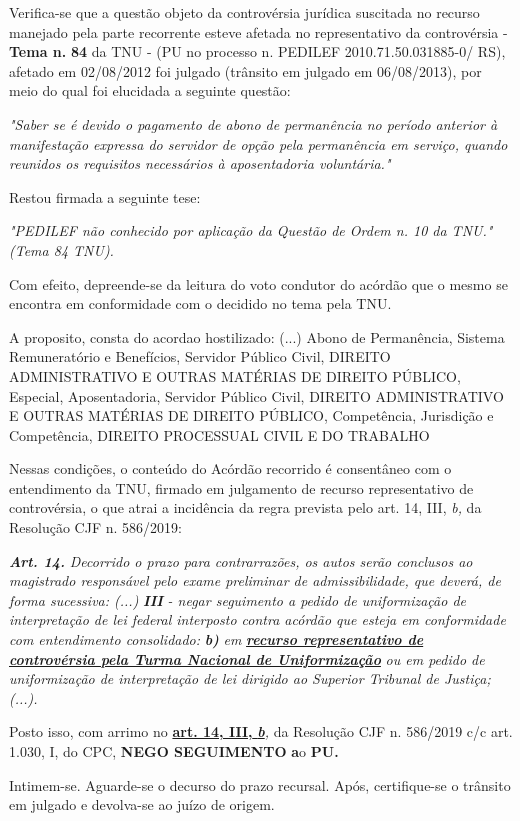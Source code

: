 \documentclass[12pt]{article}
\begin{document}
\justifying
\noindent Verifica-se que a questão objeto da controvérsia jurídica suscitada no recurso manejado pela parte recorrente esteve afetada no representativo da controvérsia - \textbf{Tema n. }\textbf{84} da TNU - (PU no processo n. PEDILEF 2010.71.50.031885-0/ RS),  afetado em 02/08/2012 foi julgado (trânsito em julgado em 06/08/2013), por meio do qual foi elucidada a seguinte questão:

\noindent \textit{"Saber se é devido o pagamento de abono de permanência no período anterior à manifestação expressa do servidor de opção pela permanência em serviço, quando reunidos os requisitos necessários à aposentadoria voluntária."}

\noindent Restou firmada a seguinte tese:

\noindent \textit{"PEDILEF não conhecido por aplicação da Questão de Ordem n. 10 da TNU." (Tema 84 TNU).}

\noindent Com efeito, depreende-se da leitura do voto condutor do acórdão que o mesmo se encontra em conformidade com o decidido no  tema pela TNU.

\noindent A proposito, consta do acordao hostilizado: (...) Abono de Permanência, Sistema Remuneratório e Benefícios, Servidor Público Civil, DIREITO ADMINISTRATIVO E OUTRAS MATÉRIAS DE DIREITO PÚBLICO, Especial, Aposentadoria, Servidor Público Civil, DIREITO ADMINISTRATIVO E OUTRAS MATÉRIAS DE DIREITO PÚBLICO, Competência, Jurisdição e Competência, DIREITO PROCESSUAL CIVIL E DO TRABALHO

\noindent Nessas condições, o conteúdo do Acórdão recorrido é consentâneo com o entendimento da TNU, firmado em julgamento de recurso representativo de controvérsia, o que atrai a incidência da regra prevista pelo art. 14, III, \textit{b,} da Resolução CJF n. 586/2019:

\noindent \textit{\textbf{Art. 14.}}\textit{ Decorrido o prazo para contrarrazões, os autos serão conclusos ao magistrado responsável pelo exame preliminar de admissibilidade, que deverá, de forma sucessiva: (...) }\textit{\textbf{III }}\textit{- negar seguimento a pedido de uniformização de interpretação de lei federal interposto contra acórdão que esteja em conformidade com entendimento consolidado: }\textit{\textbf{b)}}\textit{ em }\uline{\textit{\textbf{recurso representativo de controvérsia pela Turma Nacional de Uniformização}}}\textit{ ou em pedido de uniformização de interpretação de lei dirigido ao Superior Tribunal de Justiça;(...).}

\noindent Posto isso, com arrimo no \uline{\textbf{art. 14, III, }}\uline{\textit{\textbf{b}}}\textit{,} da Resolução CJF n. 586/2019 c/c art. 1.030, I, do CPC, \textbf{NEGO SEGUIMENTO }\textbf{a}o\textbf{ PU}\textbf{.}

\noindent Intimem-se. Aguarde-se o decurso do prazo recursal. Após, certifique-se o trânsito em julgado e devolva-se ao juízo de origem.
\end{document}
